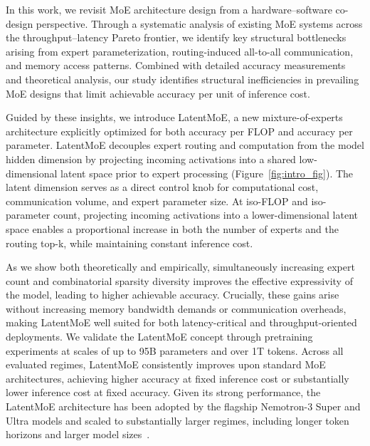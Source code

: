 In this work, we revisit MoE architecture design from a hardware–software co-design perspective. Through a systematic analysis of existing MoE systems across the throughput–latency Pareto frontier, we identify key structural bottlenecks arising from expert parameterization, routing-induced all-to-all communication, and memory access patterns. Combined with detailed accuracy measurements and theoretical analysis, our study identifies structural inefficiencies in prevailing MoE designs that limit achievable accuracy per unit of inference cost.


Guided by these insights, we introduce LatentMoE, a new mixture-of-experts architecture explicitly optimized for both accuracy per FLOP and accuracy per parameter. LatentMoE decouples expert routing and computation from the model hidden dimension by projecting incoming activations into a shared low-dimensional latent space prior to expert processing (Figure~\ref{fig:intro_fig}). The latent dimension serves as a direct control knob for computational cost, communication volume, and expert parameter size. At iso-FLOP and iso-parameter count, projecting incoming activations into a lower-dimensional latent space enables a proportional increase in both the number of experts and the routing top-k, while maintaining constant inference cost. 

As we show both theoretically and empirically, simultaneously increasing expert count and combinatorial sparsity diversity improves the effective expressivity of the model, leading to higher achievable accuracy. Crucially, these gains arise without increasing memory bandwidth demands or communication overheads, making LatentMoE well suited for both latency-critical and throughput-oriented deployments. We validate the LatentMoE concept through pretraining experiments at scales of up to 95B parameters and over 1T tokens. Across all evaluated regimes, LatentMoE consistently improves upon standard MoE architectures, achieving higher accuracy at fixed inference cost or substantially lower inference cost at fixed accuracy. Given its strong performance, the LatentMoE architecture has been adopted by the flagship Nemotron-3 Super and Ultra models and scaled to substantially larger regimes, including longer token horizons and larger model sizes~\citep{nvidia2025nvidianemotron3efficient}.
